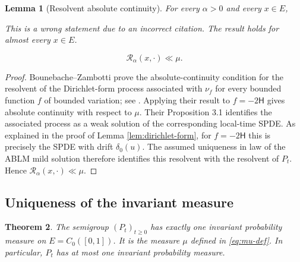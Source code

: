 \documentclass[12pt]{article}
\numberwithin{equation}{section}
\newtheorem{theorem}{Theorem}[section]
\newtheorem{lemma}[theorem]{Lemma}
\newcommand{\1}{\mathbf 1}
\newcommand{\review}[1]{\begin{reviewbox}#1\end{reviewbox}}
\begin{document}
\begin{lemma}[Resolvent absolute continuity]\label{lem:resolvent-ac}
For every $\alpha>0$ and every $x\in E$, \review{This is a wrong statement due to an incorrect citation. The result holds for almost every $x \in E$.}
\[
        \mathcal R_\alpha(x,\cdot)\ll \mu.
\]
\end{lemma}

\begin{proof}
Bounebache--Zambotti prove the absolute-continuity condition for the resolvent of
the Dirichlet-form process associated with $\nu_f$ for every bounded function
$f$ of bounded variation; see \cite[Proposition 2.5]{BZ14}. Applying their result
to $f=-2\mathsf H$ gives absolute continuity with respect to $\mu$. Their
Proposition 3.1 identifies the associated process as a weak solution of the
corresponding local-time SPDE. As explained in the proof of Lemma
\ref{lem:dirichlet-form}, for $f=-2\mathsf H$ this is precisely the SPDE with drift
$\delta_0(u)$. The assumed uniqueness in law of the ABLM mild solution therefore
identifies this resolvent with the resolvent of $P_t$. Hence
$\mathcal R_\alpha(x,\cdot)\ll\mu$.
\end{proof}

\subsection{Uniqueness of the invariant measure}

\begin{theorem}\label{thm:unique-invariant}
The semigroup $(P_t)_{t\geq0}$ has exactly one invariant probability measure on
$E=C_0([0,1])$. It is the measure $\mu$ defined in \eqref{eq:mu-def}. In particular,
$P_t$ has at most one invariant probability measure.
\end{theorem}
\end{document}
